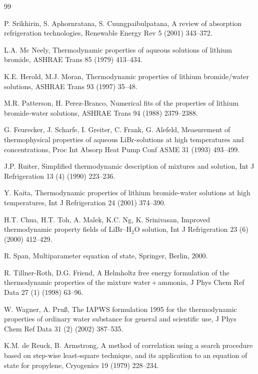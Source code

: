 \documentclass[11pt]{article}
\begin{document}
\begin{thebibliography}{99}
\small

 P. Srikhirin, S. Aphornratana, S. Cuungpaibulpatana,
A review of absorption refrigeration technologies, Renewable Energy
Rev 5 (2001) 343--372.

 L.A. Mc Neely, Thermodynamic properties of aqueous
solutions of lithium bromide, ASHRAE Trans 85 (1979) 413--434.

 K.E. Herold, M.J. Moran, Thermodynamic properties of
lithium bromide/water solutions, ASHRAE Trans 93 (1997) 35--48.

 M.R. Patterson, H. Perez-Branco, Numerical fits of the
properties of lithium bromide-water solutions, ASHRAE Trans 94 (1988)
2379--2388.

 G. Feurecker, J. Scharfe, I. Greiter, C. Frank, G. Alefeld,
Measurement of thermophysical properties of aqueous LiBr-solutions at
high temperatures and concentrations, Proc Int Absorp Heat Pump Conf
ASME 31 (1993) 493--499.

 J.P. Ruiter, Simplified thermodynamic description of
mixtures and solution, Int J Refrigeration 13 (4) (1990) 223--236.

 Y. Kaita, Thermodynamic properties of lithium
bromide-water solutions at high temperatures, Int J Refrigeration 24
(2001) 374--390.

 H.T. Chua, H.T. Toh, A. Malek, K.C. Ng, K. Srinivasan,
Improved thermodynamic property fields of LiBr--H$_2$O solution,
Int J Refrigeration 23 (6) (2000) 412--429.

 R. Span, Multiparameter equation of state, Springer,
Berlin, 2000.

 R. Tillner-Roth, D.G. Friend, A Helmholtz free energy
formulation of the thermodynamic properties of the mixture
water\,+\,ammonia, J Phys Chem Ref Data 27 (1) (1998) 63--96.

 W. Wagner, A. Pru\ss, The IAPWS formulation 1995 for the
thermodynamic properties of ordinary water substance for general and
scientific use, J Phys Chem Ref Data 31 (2) (2002) 387--535.

 K.M. de Reuck, B. Armstrong, A method of correlation
using a search procedure based on step-wise least-square technique,
and its application to an equation of state for propylene, Cryogenics
19 (1979) 228--234.


\end{thebibliography}
\end{document}
